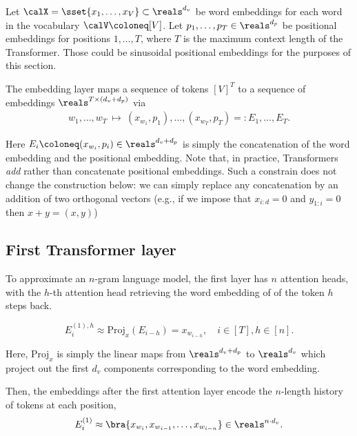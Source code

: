 Let $\calX = \sset{x_1, \ldots, x_V} \subset \reals^{d_v}$ be word embeddings for each word in the vocabulary $\calV \coloneq [V]$. Let $p_1, \ldots, p_T \in \reals^{d_p}$ be positional embeddings for positions $1, \ldots, T$, where $T$ is the maximum context length of the Transformer. Those could be sinusoidal positional embeddings for the purposes of this section.

The embedding layer maps a sequence of tokens $[V]^T$ to a sequence of embeddings $\reals^{T \times (d_v + d_p)}$ via
\begin{align*}
    w_1, \ldots, w_T \ \longmapsto \ (x_{w_1}, p_1), \ldots, (x_{w_T}, p_T) =: E_1, \ldots, E_T.
\end{align*}

Here $E_i \coloneq (x_{w_i}, p_i) \in \reals^{d_v + d_p}$ is simply the concatenation of the word embedding and the positional embedding. Note that, in practice, Transformers \textit{add} rather than concatenate positional embeddings. Such a constrain does not change the construction below: we can simply replace any concatenation by an addition of two orthogonal vectors (e.g., if we impose that $x_{i:d} = 0$ and $y_{1:i}=0$ then $x+y = (x, y)$)


\subsection*{First Transformer layer}

To approximate an $n$-gram language model, the first layer has $n$ attention heads, with the $h$-th attention head retrieving the word embedding of of the token $h$ steps back.

\[E_{i}^{(1), h} \approx \mathrm{Proj}_x(E_{i-h}) = x_{w_{i-h}}, \quad i \in [T], h \in [n].\]

Here, $\mathrm{Proj}_x$ is simply the linear maps from $\reals^{d_v + d_p}$ to $\reals^{d_v}$ which project out the first $d_v$ components corresponding to the word embedding.


Then, the embeddings after the first attention layer encode the $n$-length history of tokens at each position,
\begin{equation*}
    E_i^{(1)} \approx \bra{x_{w_{i}}, x_{w_{i-1}}, \ldots, x_{w_{i-n}}} \in \reals^{n \cdot d_v}.
\end{equation*}

